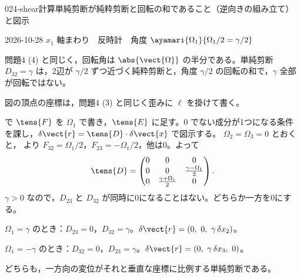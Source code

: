 \documentclass[uplatex,dvipdfmx,a4paper,11pt]{jsarticle}
\begin{document}
\begin{mondai}{024-shear}{計算}{単純剪断が純粋剪断と回転の和であること（逆向きの組み立て）と図示}
\begin{kotaeutsushi}{2026-10-28}
$x_{1}$ 軸まわり　反時計　角度 $\ayamari{\Omega_{1}}{\Omega_{1}/2=\gamma/2}$
\end{kotaeutsushi}
\begin{kizuki}
\item 問題4 (4) と同じく，回転角は $\abs{\vect{\Omega}}$ の半分である。単純剪断 $D_{32}=\gamma$ は，2辺が $\gamma/2$ ずつ近づく純粋剪断と，角度 $\gamma/2$ の回転の和で，$\gamma$ 全部が回転ではない。
\item 図の頂点の座標は，問題4 (3) と同じく歪みに $\ell$ を掛けて書く。
\end{kizuki}
\begin{tadashii}
\houshin {} で $\tens{F}$ を $\Omega_1$ で書き，$\tens{E}$ に足す。0 でない成分が1つになる条件を課し，$\delta\vect{r}=\tens{D}\cdot\delta\vect{x}$ で図示する。
\keisan {} $\Omega_2=\Omega_3=0$ とおくと， より $F_{32}=\Omega_1/2$，$F_{23}=-\Omega_1/2$，他は0。よって
\[ \tens{D}=\begin{pmatrix} 0 & 0 & 0\\ 0 & 0 & \frac{\gamma-\Omega_1}{2}\\ 0 & \frac{\gamma+\Omega_1}{2} & 0 \end{pmatrix}. \]
 $\gamma>0$ なので，$D_{23}$ と $D_{32}$ が同時に0になることはない。どちらか一方を0にする。

$\Omega_1=\gamma$ のとき：$D_{23}=0$，$D_{32}=\gamma$。$\delta\vect{r}=(0,\ 0,\ \gamma\,\delta x_2)$。

$\Omega_1=-\gamma$ のとき：$D_{32}=0$，$D_{23}=\gamma$。$\delta\vect{r}=(0,\ \gamma\,\delta x_3,\ 0)$。

どちらも，一方向の変位がそれと垂直な座標に比例する単純剪断である。


\end{tadashii}
\end{mondai}
\end{document}
